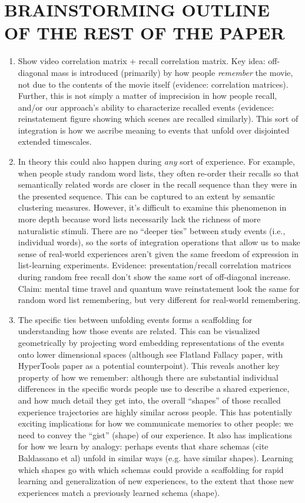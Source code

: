 \documentclass{article}
\begin{document}
\section*{BRAINSTORMING OUTLINE OF THE REST OF THE PAPER}
\begin{enumerate}
  \item Show video correlation matrix + recall correlation matrix.  Key idea: off-diagonal mass is introduced (primarily) by how people \textit{remember} the movie, not due to the contents of the movie itself (evidence: correlation matrices).  Further, this is not simply a matter of imprecision in how people recall, and/or our approach's ability to characterize recalled events (evidence: reinstatement figure showing which scenes are recalled similarly).  This sort of integration is how we ascribe meaning to events that unfold over disjointed extended timescales.
  \item In theory this could also happen during \textit{any} sort of experience.  For example, when people study random word lists, they often re-order their recalls so that semantically related words are closer in the recall sequence than they were in the presented sequence.  This can be captured to an extent by semantic clustering measures.  However, it's difficult to examine this phenomenon in more depth because word lists necessarily lack the richness of more naturalistic stimuli.  There are no ``deeper ties'' between study events (i.e., individual words), so the sorts of integration operations that allow us to make sense of real-world experiences aren't given the same freedom of expression in list-learning experiments.  Evidence: presentation/recall correlation matrices during random free recall don't show the same sort of off-diagonal increase.  Claim: mental time travel and quantum wave reinstatement look the same for random word list remembering, but very different for real-world remembering.
  \item The specific ties between unfolding events forms a scaffolding for understanding how those events are related.  This can be visualized geometrically by projecting word embedding representations of the events onto lower dimensional spaces (although see Flatland Fallacy paper, with HyperTools paper as a potential counterpoint).  This reveals another key property of how we remember: although there are substantial individual differences in the specific words people use to describe a shared experience, and how much detail they get into, the overall ``shapes'' of those recalled experience trajectories are highly similar across people.  This has potentially exciting implications for how we communicate memories to other people: we need to convey the ``gist'' (shape) of our experience.  It also has implications for how we learn by analogy: perhaps events that share schemas (cite Baldassano et al) unfold in similar ways (e.g. have similar shapes).  Learning which shapes go with which schemas could provide a scaffolding for rapid learning and generalization of new experiences, to the extent that those new experiences match a previously learned schema (shape).

\end{enumerate}
\end{document}
